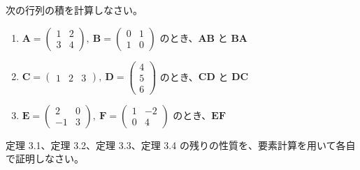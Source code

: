 \begin{quiz}
次の行列の積を計算しなさい。
\begin{enumerate}
\item $\bm{A} = \begin{pmatrix} 1 & 2 \\ 3 & 4 \end{pmatrix},\ \bm{B} = \begin{pmatrix} 0 & 1 \\ 1 & 0 \end{pmatrix}$ のとき、$\bm{A}\bm{B}$ と $\bm{B}\bm{A}$
\item $\bm{C} = \begin{pmatrix} 1 & 2 & 3 \end{pmatrix},\ \bm{D} = \begin{pmatrix} 4 \\ 5 \\ 6 \end{pmatrix}$ のとき、$\bm{C}\bm{D}$ と $\bm{D}\bm{C}$
\item $\bm{E} = \begin{pmatrix} 2 & 0 \\ -1 & 3 \end{pmatrix},\ \bm{F} = \begin{pmatrix} 1 & -2 \\ 0 & 4 \end{pmatrix}$ のとき、$\bm{E}\bm{F}$
\end{enumerate}
\end{quiz}

\begin{quiz}[定理の証明演習]
定理 3.1、定理 3.2、定理 3.3、定理 3.4 の残りの性質を、要素計算を用いて各自で証明しなさい。
\end{quiz}